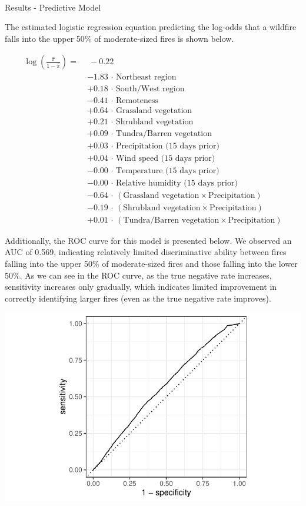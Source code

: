 \documentclass[
  letterpaper,
  DIV=11,
  numbers=noendperiod]{scrartcl}
\makeatletter
\let\oldparagraph\paragraph
\renewcommand{\paragraph}{
    \@ifstar
      \xxxParagraphStar
      \xxxParagraphNoStar
  }
\newcommand{\xxxParagraphStar}[1]{\oldparagraph*{#1}\mbox{}}
\newcommand{\xxxParagraphNoStar}[1]{\oldparagraph{#1}\mbox{}}
\makeatother
\begin{document}
\paragraph{Results - Predictive Model}\label{results---predictive-model}

The estimated logistic regression equation predicting the log-odds that
a wildfire falls into the upper 50\% of moderate-sized fires is shown
below.

\[
\begin{aligned}
\log\left(\frac{\hat{\pi}}{1-\hat{\pi}}\right) =\ &\ -0.22 \\
&- 1.83\,\cdot\,\text{Northeast region} \\
&+ 0.18\,\cdot\,\text{South/West region} \\
&- 0.41\,\cdot\,\text{Remoteness} \\
&+ 0.64\,\cdot\,\text{Grassland vegetation} \\
&+ 0.21\,\cdot\,\text{Shrubland vegetation} \\
&+ 0.09\,\cdot\,\text{Tundra/Barren vegetation} \\
&+ 0.03\,\cdot\,\text{Precipitation (15 days prior)} \\
&+ 0.04\,\cdot\,\text{Wind speed (15 days prior)} \\
&- 0.00\,\cdot\,\text{Temperature (15 days prior)} \\
&- 0.00\,\cdot\,\text{Relative humidity (15 days prior)} \\
&- 0.64\,\cdot\,(\text{Grassland vegetation} \times \text{Precipitation}) \\
&- 0.19\,\cdot\,(\text{Shrubland vegetation} \times \text{Precipitation}) \\
&+ 0.01\,\cdot\,(\text{Tundra/Barren vegetation} \times \text{Precipitation})
\end{aligned}
\]

Additionally, the ROC curve for this model is presented below. We
observed an AUC of 0.569, indicating relatively limited discriminative
ability between fires falling into the upper 50\% of moderate-sized
fires and those falling into the lower 50\%. As we can see in the ROC
curve, as the true negative rate increases, sensitivity increases only
gradually, which indicates limited improvement in correctly identifying
larger fires (even as the true negative rate improves).

\includegraphics{written-report_files/figure-pdf/unnamed-chunk-17-1.pdf}
\end{document}
